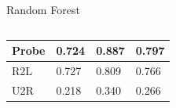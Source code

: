 \documentclass[12pt,aspectratio=169,notheorems]{beamer}
\begin{document}
\begin{frame}{Random Forest}
\begin{columns}[T]
\begin{table}[]
{\begin{tabular}{l|l|l|l|}
                \multicolumn{1}{|l|}{Probe}  & 0.724                                   & 0.887                                & 0.797                                  \\ \hline
                \multicolumn{1}{|l|}{R2L}    & 0.727                                   & 0.809                                & 0.766                                  \\ \hline
                \multicolumn{1}{|l|}{U2R}    & 0.218                                   & 0.340                                & 0.266                                  \\ \hline
                \end{tabular}
            }
            \end{table}
    \end{columns}
\end{frame}
\end{document}
